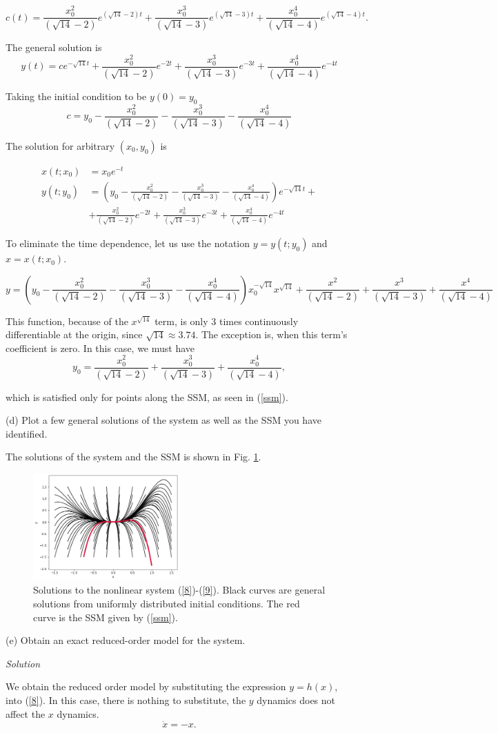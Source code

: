 \documentclass[a4paper,11pt,pdftex]{article}
\begin{document}
$$
c(t) = \frac{x_0^2}{(\sqrt{14}-2)} e^{(\sqrt{14}-2)t} + \frac{x_0^3}{(\sqrt{14}-3)} e^{(\sqrt{14}-3)t} + \frac{x_0^4}{(\sqrt{14}-4)} e^{(\sqrt{14}-4)t}.
$$

The general solution is 
$$
y(t) = ce^{-\sqrt{14}t} + \frac{x_0^2}{(\sqrt{14}-2)} e^{-2t} + \frac{x_0^3}{(\sqrt{14}-3)} e^{-3t} + \frac{x_0^4}{(\sqrt{14}-4)} e^{-4t}
$$

Taking the initial condition to be $y(0) = y_0$
$$
c = y_0 -  \frac{x_0^2}{(\sqrt{14}-2)} - \frac{x_0^3}{(\sqrt{14}-3)} - \frac{x_0^4}{(\sqrt{14}-4)}
$$

The solution for arbitrary $(x_0, y_0)$ is

\begin{align*}
    x(t;x_0) &= x_0e^{-t} \\
    y(t;y_0) &= \left( y_0 -  \frac{x_0^2}{(\sqrt{14}-2)} - \frac{x_0^3}{(\sqrt{14}-3)} - \frac{x_0^4}{(\sqrt{14}-4)}\right) e^{-\sqrt{14}t} + \\ &+\frac{x_0^2}{(\sqrt{14}-2)} e^{-2t} + \frac{x_0^3}{(\sqrt{14}-3)} e^{-3t} + \frac{x_0^4}{(\sqrt{14}-4)} e^{-4t}
\end{align*}

To eliminate the time dependence, let us use the notation $y = y(t;y_0)$ and $x=x(t;x_0)$.

$$
y = \left( y_0 -  \frac{x_0^2}{(\sqrt{14}-2)} - \frac{x_0^3}{(\sqrt{14}-3)} - \frac{x_0^4}{(\sqrt{14}-4)}\right)x_0^{-\sqrt{14}} x^{\sqrt{14}} +\frac{x^2}{(\sqrt{14}-2)} + \frac{x^3}{(\sqrt{14}-3)}+ \frac{x^4}{(\sqrt{14}-4)}
$$

This function, because of the $x^{\sqrt{14}}$ term, is only 3 times continuously differentiable at the origin, since $\sqrt{14}\approx 3.74$. The exception is, when this term's coefficient is zero. In this case, we must have 
$$
y_0 = \frac{x_0^2}{(\sqrt{14}-2)} + \frac{x_0^3}{(\sqrt{14}-3)} + \frac{x_0^4}{(\sqrt{14}-4)},
$$

which is satisfied only for points along the SSM, as seen in (\ref{ssm}).

(d) Plot a few general solutions of the system as well as the SSM you have identified.

The solutions of the system and the SSM is shown in Fig. \ref{fig1}.
\begin{figure}[h!]
    \centering
    \includegraphics[width=0.5\textwidth]{ssm.png}
    \caption{Solutions to the nonlinear system (\ref{8})-(\ref{9}). Black curves are general solutions from uniformly distributed initial conditions. The red curve is the SSM given by (\ref{ssm}). }
    \label{fig1}
\end{figure}

(e) Obtain an exact reduced-order model for the system.

\emph{Solution}

We obtain the reduced order model by substituting the expression $y=h(x)$, into (\ref{8}). In this case, there is nothing to substitute, the $y$ dynamics does not affect the $x$ dynamics.
$$
\dot{x} = -x.
$$
\end{document}
